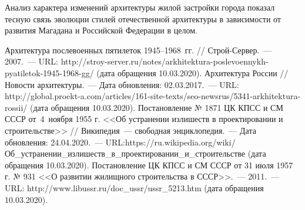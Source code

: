 Анализ характера изменений архитектуры жилой застройки города показал тесную связь эволюции стилей отечественной архитектуры в зависимости от развития Магадана и Российской Федерации в целом.

\begin{thebibliography}{99}
\bibitem{}Архитектура послевоенных пятилеток 1945--1968~гг. // Строй-Сервер.~--- 2007.~--- URL: http://stroy-server.ru/notes/arkhitektura-poslevoennykh-pyatiletok-1945-1968-gg/ (дата обращения 10.03.2020).
\bibitem{}Архитектура России // Новости архитектуры.~--- Дата обновления: 02.03.2017.~--- URL: http://global.proekt-a.com/articles/161-site-texts/seo-newsrus/5341-arkhitektura-rossii/ (дата обращения 10.03.2020).
\bibitem{}Постановление № 1871 ЦК КПСС и СМ СССР от 4 ноября 1955 г. <<Об устранении излишеств в проектировании и строительстве>> // Википедия~--- свободная энциклопедия.~--- Дата обновления: 24.04.2020.~--- URL:https://ru.wikipedia.org/wiki/Об\_устранении\_излишеств\_в\_про\-ек\-ти\-ро\-ван\-ии\_и\_строительстве (дата обращения 10.03.2020).
\bibitem{}Постановление ЦК КПСС и СМ СССР от 31 июля 1957 г. № 931 <<О развитии жилищного строительства в СССР>>.~--- 2011.~--- URL: http://www.libussr.ru/doc\_ussr/ussr\_5213.htm (дата обращения 10.03.2020).

\end{thebibliography}
